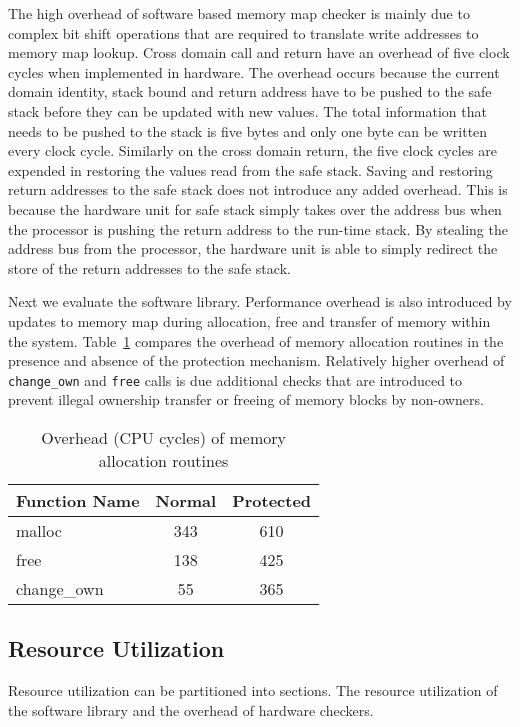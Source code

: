 The high overhead of software based memory map checker is mainly due to complex bit shift operations that are required to translate write addresses to memory map lookup.
%
Cross domain call and return have an overhead of five clock cycles when implemented in hardware.
%
The overhead occurs because the current domain identity, stack bound and return address have to be pushed to the safe stack before they can be updated with new values.
%
The total information that needs to be pushed to the stack is five bytes and only one byte can be written every clock cycle.
%
Similarly on the cross domain return, the five clock cycles are expended in restoring the values read from the safe stack.
%
Saving and restoring return addresses to the safe stack does not introduce any added overhead.
%
This is because the hardware unit for safe stack simply takes over the address bus when the processor is pushing the return address to the run-time stack.
%
By stealing the address bus from the processor, the hardware unit is able to simply redirect the store of the return addresses to the safe stack.

Next we evaluate the software library.
%
Performance overhead is also introduced by updates to memory map during allocation, free and transfer of memory within the system.
%
Table~\ref{tab:malloc_comparison} compares the overhead of memory allocation routines in the presence and absence of the protection mechanism.
%
Relatively higher overhead of \texttt{change\_own} and \texttt{free} calls is due additional checks that are introduced to prevent illegal ownership transfer or freeing of memory blocks by non-owners.
%
\begin{table}[htdp]
\centering
\small{
\begin{tabular}{|l|c|c|}
	\hline
	Function Name & Normal & Protected \\
	\hline
	malloc  & 343 & 610\\
	free & 138 & 425\\
	change\_own & 55 & 365 \\
	\hline
\end{tabular}}
\caption{Overhead (CPU cycles) of memory allocation routines}
\label{tab:malloc_comparison}
\end{table}
%

\subsection{Resource Utilization}
%
Resource utilization can be partitioned into sections.
%
The resource utilization of the software library and the overhead of hardware checkers.
%

